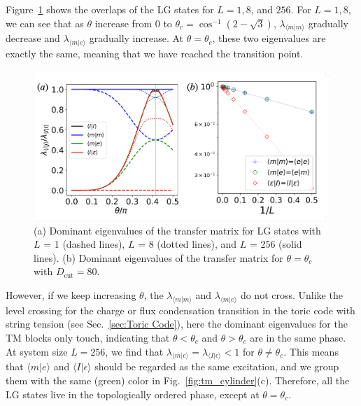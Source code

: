 \documentclass{ntuthesis}
\begin{document}
Figure~\ref{fig:HOTRG_LG} shows the overlaps of the LG states for $L = 1, 8$, and $256$. 
%
For $L = 1, 8$, we can see that as $\theta$ increase from $0$ to $\theta_c = \cos^{-1}{(2-\sqrt{3})}$, $\lambda_{\langle m| m\rangle}$ gradually decrease and $\lambda_{\langle m| e\rangle}$ gradually increase. 
%
At $\theta = \theta_c$, these two eigenvalues are exactly the same, meaning that we have reached the transition point. 
%

\begin{figure}[t]
\centering
\includegraphics[width=\linewidth]{HOTRG_LG}
\caption{  (a)  Dominant eigenvalues of the transfer matrix for LG states with $L$ = 1 (dashed lines), $L$ = 8 (dotted lines), and $L$ = 256 (solid lines).  (b)  Dominant eigenvalues of the transfer matrix  for $\theta=\theta_c$ with $D_\text{cut} = 80$. }
\label{fig:HOTRG_LG}
\end{figure}


However, if we keep increasing $\theta$, the $\lambda_{\langle m| m\rangle}$ and $\lambda_{\langle m| e\rangle}$ do not cross. 
%
Unlike the level crossing for the charge or flux condensation transition in the toric code with string tension (see Sec.~\ref{sec:Toric Code}), here the dominant eigenvalues for the TM blocks only touch, indicating that $\theta < \theta_c$ and $\theta > \theta_c$ are in the same phase.
%
At  system size $L = 256$, we find that $\lambda_{\langle m| e\rangle} = \lambda_{\langle I| \epsilon\rangle} < 1$ for $\theta \neq \theta_c$. 
%
This means that $\langle m| e\rangle $ and $\langle I| \epsilon\rangle$ should be regarded as the same excitation, and we group them with the same (green) color in Fig.~\ref{fig:tm_cylinder}(c). 
%
Therefore, all the LG states live in the topologically ordered phase, except at $\theta = \theta_c$. 
\end{document}
